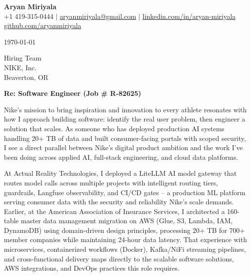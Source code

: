 \documentclass[letterpaper,11pt]{article}
\begin{document}
\begin{center}
  {\LARGE \textbf{Aryan Miriyala}}\\[4pt]
  \small
  +1 419-315-0444 $|$ \href{mailto:aryanmiriyala@gmail.com}{aryanmiriyala@gmail.com} $|$ \href{https://www.linkedin.com/in/aryan-miriyala-7788a21b6/}{linkedin.com/in/aryan-miriyala}\\
  \href{https://github.com/aryanmiriyala}{github.com/aryanmiriyala}
\end{center}\vspace{12pt}

\today

\vspace{12pt}

Hiring Team\\
NIKE, Inc.\\
Beaverton, OR

\vspace{12pt}

\textbf{Re: Software Engineer (Job \# R-82625)}

\vspace{8pt}

Nike's mission to bring inspiration and innovation to every athlete resonates with how I approach building software: identify the real user problem, then engineer a solution that scales. As someone who has deployed production AI systems handling 20+ TB of data and built consumer-facing portals with scoped security, I see a direct parallel between Nike's digital product ambition and the work I've been doing across applied AI, full-stack engineering, and cloud data platforms.

\vspace{8pt}

At Actual Reality Technologies, I deployed a LiteLLM AI model gateway that routes model calls across multiple projects with intelligent routing tiers, guardrails, Langfuse observability, and CI/CD gates -- a production ML platform serving consumer data with the security and reliability Nike's scale demands. Earlier, at the American Association of Insurance Services, I architected a 160-table master data management migration on AWS (Glue, S3, Lambda, IAM, DynamoDB) using domain-driven design principles, processing 20+ TB for 700+ member companies while maintaining 24-hour data latency. That experience with microservices, containerized workflows (Docker), Kafka/NiFi streaming pipelines, and cross-functional delivery maps directly to the scalable software solutions, AWS integrations, and DevOps practices this role requires.
\end{document}

